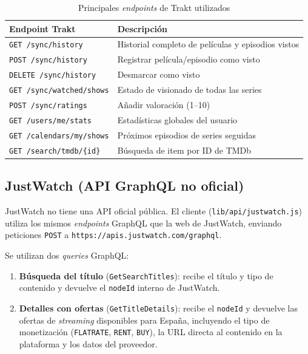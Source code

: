 \clearpage
\begin{table}[!t]
\begin{center}
\begin{tabular}{| l | l |}
\hline
\textbf{Endpoint Trakt} & \textbf{Descripción} \\
\hline
\hline
\texttt{GET /sync/history} & Historial completo de películas y episodios vistos \\
\hline
\texttt{POST /sync/history} & Registrar película/episodio como visto \\
\hline
\texttt{DELETE /sync/history} & Desmarcar como visto \\
\hline
\texttt{GET /sync/watched/shows} & Estado de visionado de todas las series \\
\hline
\texttt{POST /sync/ratings} & Añadir valoración (1--10) \\
\hline
\texttt{GET /users/me/stats} & Estadísticas globales del usuario \\
\hline
\texttt{GET /calendars/my/shows} & Próximos episodios de series seguidas \\
\hline
\texttt{GET /search/tmdb/\{id\}} & Búsqueda de item por ID de TMDb \\
\hline
\end{tabular}
\caption{Principales \textit{endpoints} de Trakt utilizados}
\label{tab:trakt-endpoints}
\end{center}
\end{table}

\subsection{JustWatch (API GraphQL no oficial)}

JustWatch no tiene una API oficial pública. El cliente (\texttt{lib/api/justwatch.js}) utiliza los mismos \textit{endpoints} GraphQL que la web de JustWatch, enviando peticiones \texttt{POST} a \texttt{https://apis.justwatch.com/graphql}.

Se utilizan dos \textit{queries} GraphQL:

\begin{enumerate}
\item \textbf{Búsqueda del título} (\texttt{GetSearchTitles}): recibe el título y tipo de contenido y devuelve el \texttt{nodeId} interno de JustWatch.
\item \textbf{Detalles con ofertas} (\texttt{GetTitleDetails}): recibe el \texttt{nodeId} y devuelve las ofertas de \textit{streaming} disponibles para España, incluyendo el tipo de monetización (\texttt{FLATRATE}, \texttt{RENT}, \texttt{BUY}), la URL directa al contenido en la plataforma y los datos del proveedor.
\end{enumerate}

